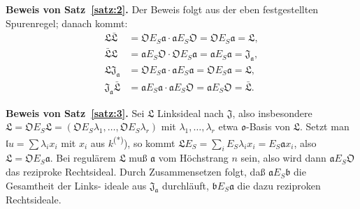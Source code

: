 \documentclass[12pt,a4paper]{article}
\theoremstyle{plain}
\begin{document}
\medskip
\noindent\textbf{Beweis von Satz~\ref{satz:2}.}\hspace{0.5em}%
Der Beweis folgt aus der eben festgestellten
Spurenregel; danach kommt:
\begin{align*}
\mathfrak{L} \bar{\mathfrak{L}} &= \mathfrak{O} E_S \mathfrak{a} \cdot \mathfrak{a} E_S \mathfrak{O} = \mathfrak{O} E_S \mathfrak{a} = \mathfrak{L}, \\
\bar{\mathfrak{L}} \mathfrak{L} &= \mathfrak{a} E_S \mathfrak{O} \cdot \mathfrak{O} E_S \mathfrak{a} = \mathfrak{a} E_S \mathfrak{a} = \mathfrak{J}_{\mathfrak{a}}, \\
\mathfrak{L} \mathfrak{J}_{\mathfrak{a}} &= \mathfrak{O} E_S \mathfrak{a} \cdot \mathfrak{a} E_S \mathfrak{a} = \mathfrak{O} E_S \mathfrak{a} = \mathfrak{L}, \\
\mathfrak{J}_{\mathfrak{a}} \bar{\mathfrak{L}} &= \mathfrak{a} E_S \mathfrak{a} \cdot \mathfrak{a} E_S \mathfrak{O} = \mathfrak{a} E_S \mathfrak{O} = \bar{\mathfrak{L}}.
\end{align*}

\medskip
\noindent\textbf{Beweis von Satz~\ref{satz:3}.}\hspace{0.5em}%
Sei $\mathfrak{L}$ Linksideal nach $\mathfrak{J}$, also insbesondere
$\mathfrak{L} = \mathfrak{O} E_S \mathfrak{L} = (\mathfrak{O} E_S \lambda_1, \ldots, \mathfrak{O} E_S \lambda_r)$ mit $\lambda_1, \ldots, \lambda_r$ etwa $\mathfrak{o}$-Basis von $\mathfrak{L}$.
Setzt man $\mathfrak{l} u = \sum \lambda_i x_i$ mit $x_i$ aus $k$\textsuperscript{(*)}), so kommt $\mathfrak{L} E_S =
\sum_i E_S \lambda_i x_i = E_S \mathfrak{a} x_i$, also $\mathfrak{L} = \mathfrak{O} E_S \mathfrak{a}$. Bei regul\"arem $\mathfrak{L}$ mu\ss{} $\mathfrak{a}$ vom
H\"ochstrang $n$ sein, also wird dann $\mathfrak{a} E_S \mathfrak{O}$ das reziproke Rechtsideal.
Durch Zusammensetzen folgt, da\ss{} $\mathfrak{a} E_S \mathfrak{b}$ die Gesamtheit der Links-
ideale aus $\mathfrak{J}_{\mathfrak{a}}$ durchl\"auft, $\mathfrak{b} E_S \mathfrak{a}$ die dazu reziproken Rechtsideale.
\end{document}
